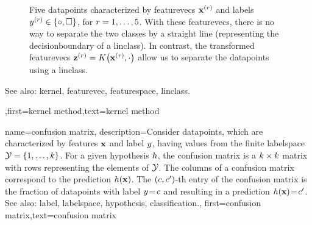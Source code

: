 {{\begin{figure}[H]
\begin{center}
\end{center}
\caption{
Five \glspl{datapoint} characterized by \glspl{featurevec} ${\bf x}^{(r)}$ 
and \glspl{label} $y^{(r)} \in \{ \circ, \square \}$, for $r=1,\ldots,5$. 
With these \glspl{featurevec}, there is no way to separate the two classes 
by a straight line (representing the \gls{decisionboundary} of a \gls{linclass}). 
In contrast, the transformed \glspl{featurevec} ${\bf z}^{(r)} = K\big({\bf x}^{(r)},\cdot\big)$ 
allow us to separate the \glspl{datapoint} using a \gls{linclass}.  \label{fig_linsep_kernel_dict}}
\end{figure}
		See also: \gls{kernel}, \gls{featurevec}, \gls{featurespace}, \gls{linclass}.
},first={kernel method},text={kernel method} }
	

{name={confusion matrix}, 
 description={Consider \glspl{datapoint}, which are characterized 
		by \glspl{feature} ${\bf x}$ and \gls{label} $y$, having values from the finite 
		\gls{labelspace} $\mathcal{Y} = \{1,\ldots,k\}$. For a given \gls{hypothesis} $h$, 
		the confusion matrix is a $k \times k$ matrix with rows representing the elements of 
		$\mathcal{Y}$. The columns of a confusion matrix correspond to the \gls{prediction} $h({\bf x})$. 
		The $(c,c')$-th entry of the confusion matrix is the fraction of 
		\glspl{datapoint} with \gls{label} $y\!=\! c$ and resulting in a \gls{prediction} $h({\bf x})\!=\!c'$.
				\\
		See also: \gls{label}, \gls{labelspace}, \gls{hypothesis}, \gls{classification}.},
	first={confusion matrix},text={confusion matrix} }



